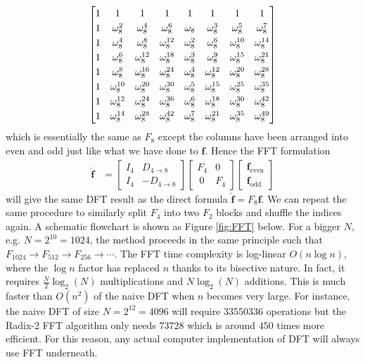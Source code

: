 \begin{align*}
\renewcommand\arraystretch{1.25}
\begin{bmatrix}
1 & 1 & 1 & 1 & 1 & 1 & 1 & 1 \\
1 & \omega_8^2 & \omega_8^4 & \omega_8^6 & \omega_8 & \omega_8^3 & \omega_8^5 & \omega_8^7 \\
1 & \omega_8^4 & \omega_8^8 & \omega_8^{12} & \omega_8^2 & \omega_8^6 & \omega_8^{10} & \omega_8^{14} \\
1 & \omega_8^6 & \omega_8^{12} & \omega_8^{18} & \omega_8^3 & \omega_8^9 & \omega_8^{15} & \omega_8^{21} \\
1 & \omega_8^8 & \omega_8^{16} & \omega_8^{24} & \omega_8^4 & \omega_8^{12} & \omega_8^{20} & \omega_8^{28} \\
1 & \omega_8^{10} & \omega_8^{20} & \omega_8^{30} & \omega_8^5 & \omega_8^{15} & \omega_8^{25} & \omega_8^{35} \\
1 & \omega_8^{12} & \omega_8^{24} & \omega_8^{36} & \omega_8^6 & \omega_8^{18} & \omega_8^{30} & \omega_8^{42} \\
1 & \omega_8^{14} & \omega_8^{28} & \omega_8^{42} & \omega_8^7 & \omega_8^{21} & \omega_8^{35} & \omega_8^{49} \\
\end{bmatrix}    
\end{align*}
which is essentially the same as $F_8$ except the columns have been arranged into even and odd just like what we have done to $\textbf{f}$. Hence the FFT formulation
\begin{align*}
\hat{\textbf{f}} &= 
\begin{bmatrix}
I_4 & D_{4 \to 8} \\
I_4 & -D_{4 \to 8}
\end{bmatrix}
\begin{bmatrix}
F_4 & 0 \\\
0 & F_4
\end{bmatrix}
\begin{bmatrix}
\textbf{f}_{\text{even}} \\
\textbf{f}_{\text{odd}}
\end{bmatrix}
\end{align*}
will give the same DFT result as the direct formula $\hat{\textbf{f}} = F_8\textbf{f}$. We can repeat the same procedure to similarly split $F_4$ into two $F_2$ blocks and shuffle the indices again. A schematic flowchart is shown as Figure \ref{fig:FFT} below. For a bigger $N$, e.g. $N = 2^{10} = 1024$, the method proceeds in the same principle such that $F_{1024} \to F_{512} \to F_{256} \to \cdots$. The FFT time complexity is log-linear $O(n \log n)$, where the $\log n$ factor has replaced $n$ thanks to its bisective nature. In fact, it requires $\frac{N}{2}\log_2(N)$ multiplications and $N\log_2(N)$ additions. This is much faster than $O(n^2)$ of the naive DFT when $n$ becomes very large. For instance, the naive DFT of size $N = 2^{12} = 4096$ will require $33550336$ operations but the Radix-2 FFT algorithm only needs $73728$ which is around $450$ times more efficient. For this reason, any actual computer implementation of DFT will always use FFT underneath.

